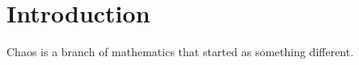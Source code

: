 \chapter{Introduction}

Chaos is a branch of mathematics that started as something different. \cite{ott_chaos_2002}
